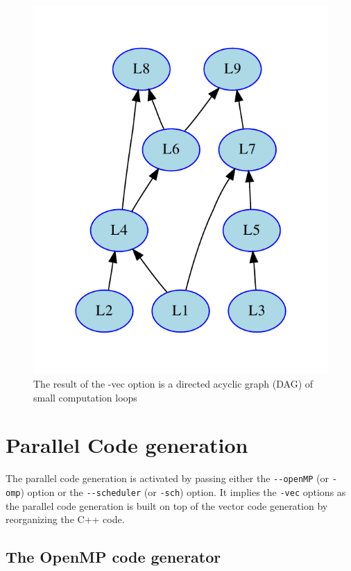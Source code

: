 \documentclass[a4paper,10pt]{book}
\begin{document}
\begin{figure}[htb]
  \centering
  \includegraphics[scale=0.75]{graphs/loopgraph2}
  \caption{The result of the -vec option is a directed acyclic graph (DAG) of small computation loops}   
  \label{fig:loopgraph}
\end{figure}


\section{Parallel Code generation}

The parallel code generation is activated by passing either the \lstinline!--openMP! (or \lstinline!-omp!) option or the \lstinline!--scheduler! (or \lstinline!-sch!) option. It implies the \lstinline!-vec! options as the parallel code generation is built on top of the vector code generation by reorganizing the C++ code.  


\subsection{The OpenMP code generator}
\end{document}
